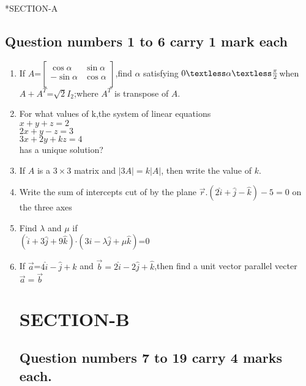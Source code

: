 \documentclass{article}
\begin{document}
\providecommand{\myvec}







\section*{\centering SECTION-A}
\subsection*{\centering Question numbers 1 to 6 carry 1 mark each}
\begin{enumerate}
	\item If $A$=$\left[
			\begin{matrix}
			\cos\alpha&\sin\alpha\\
			-\sin\alpha&\cos\alpha\\
			\end{matrix}
	        	\right]$,find $\alpha$ satisfying $0\textless\alpha\textless\frac{\pi}{2}$when $A+A^T$=$\sqrt{2}$$I_{2}$;where $A^T$ is transpose of $A$.
	\item For what values of k,the system of linear equations\\
		$x+y+z=2$\\
		$2x+y-z=3$\\
		$3x+2y+kz=4$\\
		has a unique solution?
	
\item If $A$ is a $3\times 3$ matrix and $|3A|=k|A|$, then write the value of $k$.
\item Write the sum of intercepts cut of by the plane $\vec{r}.(2\hat{i}+\hat{j}-\hat{k})-5=0$ on the three axes

\item Find $\lambda$ and $\mu$ if\\
	$(\hat{i}+3\hat{j}+9\hat{k})$$\cdot$$(3\hat{i}-\lambda\hat{j}+\mu\hat{k})$=$0$
	
\item If $\vec{a}$=$4\hat{i}-\hat{j}+\hat{k}$ and $\vec{b}=2\hat{i}-2\hat{j}+\hat{k}$,then find a unit vector parallel vecter $\vec{a}=\vec{b}$


	\section*{\centering SECTION-B}
		\subsection*{\centering Question numbers 7 to 19 carry 4 marks	each.}
		

\end{enumerate}
\end{document}
